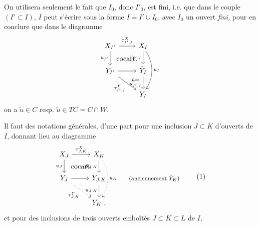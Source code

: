 \documentclass[11pt]{article}
\newcommand{\msp}[1]{\marginpar{\footnotesize [#1]}}
\newcommand{\cocart}{\textup{cocart.}}
\begin{document}
On utilisera seulement le fait que $I_0$, donc $I'_0$, est fini, i.e. que dans le couple $(I' \subset I)$, $I$ peut s'écrire sous la forme $I = I' \cup I_0$, avec $I_0$ un ouvert \textit{fini,} pour en conclure que dans le diagramme
\[
\begin{tikzcd}
X_{I'} \arrow[r, "\tau^X_{I',I}"] \arrow[d, "u_{I'}"'] \arrow[dr, phantom, "\cocart"] & X_I \arrow[d, "v_{I',I}"'] \arrow[dd, bend left=30, "u_I"] \\
Y_{I'} \arrow[r] \arrow[dr, "\tau^Y_{I',I}"'] & \tilde{Y}_I \arrow[d, "\substack{\tilde{u} =\\ u_{I',I}}"'] \\
& Y_I
\end{tikzcd}
\]
on a $\tilde{u} \in C$ resp. $\tilde{u} \in TC = C \cap W$.

\msp{page 14}

Il faut des notations générales, d'une part pour une inclusion $J \subset K$ d'ouverts de $I$, donnant lieu au diagramme
\[
\begin{tikzcd}
X_J \arrow[r, "\tau^X_{J,K}"] \arrow[d, "u_J"'] \arrow[dr, phantom, "\cocart"] & X_K \arrow[d, "\tilde{u}_{J,K}"'] \arrow[dd, dotted, bend left=30, "u_K"] & \\
Y_J \arrow[r] \arrow[dr, dotted, "\tau^Y_{J,K}"'] & Y_{J,K} \arrow[d, "u_{J,K}"'] & \text{\footnotesize (anciennement $\tilde{Y}_K$)} \\
& Y_K\ , &
\end{tikzcd}
\tag*{(1)}
\]
et pour des inclusions de trois ouverts emboîtés $J \subset K \subset L$ de $I$,
\end{document}
